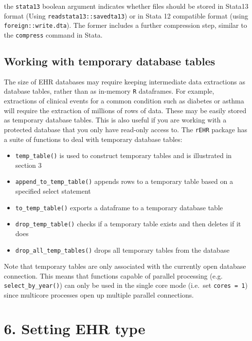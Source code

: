 \documentclass[]{article}
\begin{document}
the \texttt{stata13} boolean argument indicates whether files should be
stored in Stata13 format (Using \texttt{readstata13::savedta13}) or in
Stata 12 compatible format (using \texttt{foreign::write.dta}). The
former includes a further compression step, similar to the
\texttt{compress} command in Stata.

\subsection{Working with temporary database
tables}\label{working-with-temporary-database-tables}

The size of EHR databases may require keeping intermediate data
extractions as database tables, rather than as in-memory \texttt{R}
dataframes. For example, extractions of clinical events for a common
condition such as diabetes or asthma will require the extraction of
millions of rows of data. These may be easily stored as temporary
database tables. This is also useful if you are working with a protected
database that you only have read-only access to. The \texttt{rEHR}
package has a suite of functions to deal with temporary database tables:

\begin{itemize}
\itemsep1pt\parskip0pt
\item
  \texttt{temp\_table()} is used to construct temporary tables and is
  illustrated in section 3
\item
  \texttt{append\_to\_temp\_table()} appends rows to a temporary table
  based on a specified select statement
\item
  \texttt{to\_temp\_table()} exports a dataframe to a temporary database
  table
\item
  \texttt{drop\_temp\_table()} checks if a temporary table exists and
  then deletes if it does
\item
  \texttt{drop\_all\_temp\_tables()} drops all temporary tables from the
  database
\end{itemize}

Note that temporary tables are only associated with the currently open
database connection. This means that functions capable of parallel
processing (e.g. \texttt{select\_by\_year()}) can only be used in the
single core mode (i.e.~set \texttt{cores = 1}) since multicore processes
open up multiple parallel connections.

\section{6. Setting EHR type}\label{setting-ehr-type}
\end{document}
